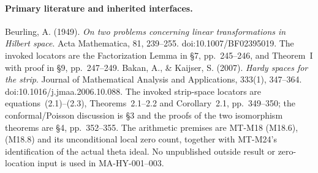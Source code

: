 \paragraph{Primary literature and inherited interfaces.}
Beurling, A. (1949).
\emph{On two problems concerning linear transformations in
Hilbert space}. Acta Mathematica, 81, 239--255.
doi:10.1007/BF02395019.
The invoked locators are the Factorization Lemma in \S7,
pp.~245--246, and Theorem~I with proof in \S9,
pp.~247--249.
Bakan, A., \& Kaijser, S. (2007).
\emph{Hardy spaces for the strip}.
Journal of Mathematical Analysis and Applications, 333(1),
347--364. doi:10.1016/j.jmaa.2006.10.088.
The invoked strip-space locators are equations~(2.1)--(2.3),
Theorems~2.1--2.2 and Corollary~2.1, pp.~349--350;
the conformal/Poisson discussion is \S3 and the proofs of
the two isomorphism theorems are \S4, pp.~352--355.
The arithmetic premises are MT-M18 (M18.6), (M18.8) and
its unconditional local zero count, together with MT-M24's
identification of the actual theta ideal.
No unpublished outside result or zero-location input is
used in MA-HY-001--003.
